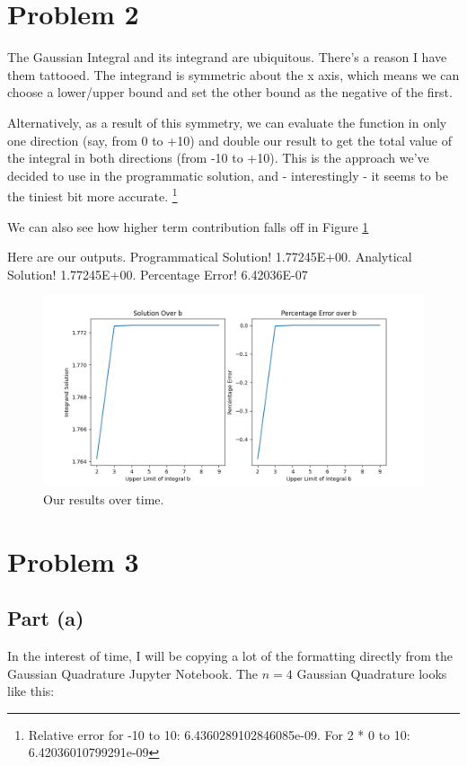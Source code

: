 \documentclass{article}
\begin{document}
\section{Problem 2}
The Gaussian Integral and its integrand are ubiquitous. There's a reason I have them tattooed. The integrand is symmetric about the x axis, which means we can choose a lower/upper bound and set the other bound as the negative of the first.

Alternatively, as a result of this symmetry, we can evaluate the function in only one direction (say, from 0 to +10) and double our result to get the total value of the integral in both directions (from -10 to +10). This is the approach we've decided to use in the programmatic solution, and - interestingly - it seems to be the tiniest bit more accurate. \footnote{Relative error for -10 to 10: 6.4360289102846085e-09. For 2 * 0 to 10: 6.42036010799291e-09}

We can also see how higher term contribution falls off in Figure \ref{fig:boat1}

Here are our outputs. Programmatical Solution! 1.77245E+00. Analytical Solution! 1.77245E+00. Percentage Error! 6.42036E-07%

\begin{figure}
\includegraphics[width=\linewidth]{Figure_1.png}
  \caption{Our results over time.}
  \label{fig:boat1}
\end{figure}

\section{Problem 3}
\subsection{Part (a)}
In the interest of time, I will be copying a lot of the formatting directly from the Gaussian Quadrature Jupyter Notebook. The $n=4$ Gaussian Quadrature looks like this:
\end{document}
